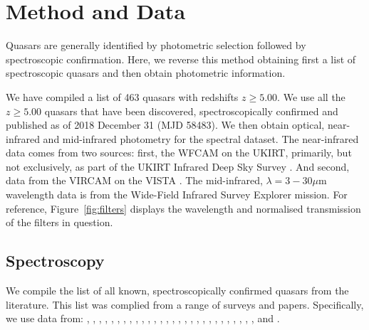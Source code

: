 \documentclass[usenatbib]{mnras}
\begin{document}
\vspace{-16pt}
\section{Method and Data}
Quasars are generally identified by photometric selection followed by
spectroscopic confirmation. Here, we reverse this method obtaining
first a list of spectroscopic quasars and then obtain photometric
information.

We have compiled a list of 463 quasars with redshifts $z\geq5.00$. We
use all the $z\geq5.00$ quasars that have been discovered,
spectroscopically confirmed and published as of 2018 December 31 (MJD
58483). We then obtain optical, near-infrared and mid-infrared
photometry for the spectral dataset. The near-infrared data comes from
two sources: first, the WFCAM \citep[][]{Casali2007} on the UKIRT,
primarily, but not exclusively, as part of the UKIRT Infrared Deep Sky
Survey \citep[UKIDSS; ][]{Lawrence2007}.  And second, data from the
VIRCAM on the VISTA \citep[][]{Emerson2006, Dalton2006}. The
mid-infrared, $\lambda=3-30\mu$m wavelength data is from the 
Wide-Field Infrared Survey Explorer \citep[WISE;][]{Wright2010,
Cutri2013} mission. For reference, Figure~\ref{fig:filters} displays
the wavelength and normalised transmission of the filters in question.

\subsection{Spectroscopy} 
We compile the list of all known, spectroscopically confirmed
quasars from the literature.  This list was complied from a range of
surveys and papers.  Specifically, we use data from:
\citet{Banados2014, Banados2016, Banados2018}, 
\citet{Becker2015}, 
\citet{Calura2014}, 
\citet{Carilli2007, Carilli2010}, 
\citet{Carnall2015}, 
\citet{Cool2006}, 
\citet{DeRosa2011}, 
\citet{Fan2000, Fan2001c, Fan2003, Fan2004, Fan2006, Fan2018}, 
\citet{Goto2006}, 
\citet{Ikeda2017}, 
\citet{Jiang2008, Jiang2009, Jiang2015, Jiang2016},   
\citet{Kashikawa2015}, 
\citet{Koptelova2017}, 
\citet{Kim2015, Kim2018},  
\citet{Kurk2007, Kurk2009}, 
\citet{Leipski2014}, 
\citet{Mahabal2005}, 
\citet{Matsuoka2016,  Matsuoka2018a, Matsuoka2018b},   
\citet{Mazzucchelli2017}, 
\citet{Morganson2012}, 
\citet{Mortlock2009, Mortlock2011},
\citet{McGreer2006, McGreer2013},  
\citet{Reed2015, Reed2017}, 
\citet{Stern2007},  
\citet{Tang2017}, 
\citet{Venemans2007, Venemans2012, Venemans2013, Venemans2015a, Venemans2015b, Venemans2016},
\citet{WangF2016, WangF2017, WangF2018a, WangF2018b},
\citet{Willott2007, Willott2009, Willott2010a, Willott2013b, Willott2015}, 
\citet{Wu2015} 
\citet{YangJ2018a, YangJ2018b}  
and 
\citet{Zeimann2011}. 
\end{document}
